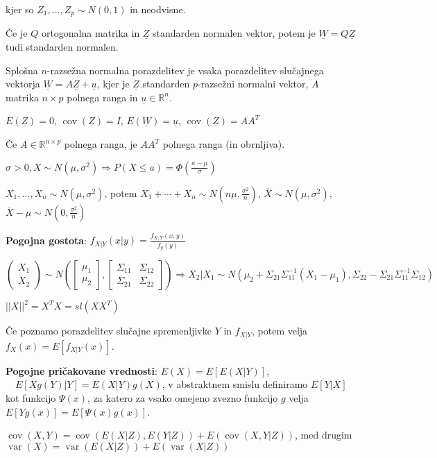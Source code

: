 \documentclass[11pt,a4paper]{amsart}
\theoremstyle{definition} %
\theoremstyle{plain} %
\newcommand{\R}{\mathbb R}
\newcommand{\Z}{\underline{Z}}
\newcommand{\W}{\underline{W}}
\newcommand{\uu}{\underline{u}}
\DeclareMathOperator{\cov}{cov}
\DeclareMathOperator{\var}{var}
\begin{document}
  kjer so $Z_1, \ldots , Z_p \sim N(0,1)$ in neodvisne.

Če je $Q$ ortogonalna matrika in $\Z$ standarden normalen vektor,
potem je $\W = Q\Z$ tudi standarden normalen.

Splošna $n$-razsežna normalna porazdelitev je vsaka porazdelitev slučajnega
vektorja $\W = A\Z+\uu$, kjer je $\Z$
standarden $p$-razsežni normalni vektor, $A$ matrika $n \times p$ polnega ranga
in $\uu \in \R^n$.

$E(\Z) = 0$, $\cov(\Z) = I$, $E(\underline{W}) =
\uu$, $\cov(\Z) = AA^T$

Če $A \in \R^{n\times p}$ polnega ranga, je $AA^T$ polnega ranga (in obrnljiva).

$\sigma > 0, X \sim N(\mu, \sigma^2 ) \Longrightarrow P(X \leq a ) = \Phi
(\frac{a-\mu}{\sigma})$

$X_1,\ldots, X_n \sim N(\mu, \sigma^2)$, potem $X_1  + \cdots +  X_n \sim N(n\mu, \frac{\sigma^2}{n})$, $\overline{X} \sim N(\mu, \sigma^2)$, $\overline{X} - \mu \sim N(0, \frac{\sigma^2}{n})$

\textbf{Pogojna gostota}: $f_{X|Y}(x|y) = \frac{f_{X,Y}(x,y)}{f_y (y)}$

$\left( \begin{matrix} X_1 \\ X_2 \end{matrix} \right)
\sim
N \left(
\left[ \begin{matrix} \mu_1 \\ \mu_2 \end{matrix} \right],
\left[ \begin{matrix} \Sigma_{11} & \Sigma_{12} \\ \Sigma_{21} & \Sigma_{22} \end{matrix} \right] \right)
\Longrightarrow
X_2 | X_1 \sim N(\mu_2 +  \Sigma_{21}\Sigma_{11}^{-1} (X_1 - \mu_1), \Sigma_{22} - \Sigma_{21} \Sigma_{11}^{-1} \Sigma_{12} )$

$||X||^2 = X^T X = sl(XX^T)$

Če poznamo porazdelitev slučajne spremenljivke $Y$ in $f_{X|Y}$, potem velja
$f_X(x) = E[f_{X|Y}(x)]$.

\textbf{Pogojne pričakovane vrednosti}: $E(X) = E[E(X|Y)]$, $ \quad E[Xg(Y)|Y] =
E(X|Y)g(X)$, v abstraktnem smislu definiramo $E[Y|X]$ kot funkcijo $\Psi(x)$, za katero
za vsako omejeno zvezno funkcijo $g$ velja $E[Yg(x)]=E[\Psi(x)g(x)]$.

$\cov(X,Y) = \cov(E(X|Z),E(Y|Z)) + E(\cov(X,Y|Z))$, med drugim $\var(X) =
\var(E(X|Z)) + E(\var(X|Z))$
\end{document}
